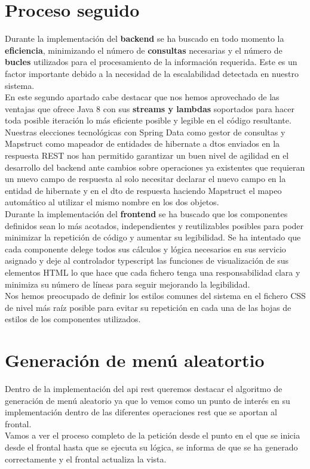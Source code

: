 \documentclass[12pt, a4paper, twoside]{book}
\begin{document}
	\section{Proceso seguido}
	Durante la implementación del \textbf{backend} se ha buscado en todo momento la \textbf{eficiencia}, minimizando el número de \textbf{consultas} necesarias y el número de \textbf{bucles} utilizados para el procesamiento de la información requerida. Este es un factor importante debido a la necesidad de la escalabilidad detectada en nuestro sistema.\\
	En este segundo apartado cabe destacar que nos hemos aprovechado de las ventajas que ofrece Java 8 con sus \textbf{streams y lambdas} soportados para hacer toda posible iteración lo más eficiente posible y legible en el código resultante.\\
	Nuestras elecciones tecnológicas con Spring Data como gestor de consultas y Mapstruct como mapeador de entidades de hibernate a dtos enviados en la respuesta REST nos han permitido garantizar un buen nivel de agilidad en el desarrollo del backend ante cambios sobre operaciones ya existentes que requieran un nuevo campo de respuesta al solo necesitar declarar el nuevo campo en la entidad de hibernate y en el dto de respuesta haciendo Mapstruct el mapeo automático al utilizar el mismo nombre en los dos objetos.\\
	Durante la implementación del \textbf{frontend} se ha buscado que los componentes definidos sean lo más acotados, independientes y reutilizables posibles para poder minimizar la repetición de código y aumentar su legibilidad. Se ha intentado que cada componente delege todos sus cálculos y lógica necesarios en sus servicio asignado y deje al controlador typescript las funciones de visualización de sus elementos HTML lo que hace que cada fichero tenga una responsabilidad clara y minimiza su número de líneas para seguir mejorando la legibilidad.\\
	Nos hemos preocupado de definir los estilos comunes del sistema en el fichero CSS de nivel más raíz posible para evitar su repetición en cada una de las hojas de estilos de los componentes utilizados.
	\section{Generación de menú aleatortio}
	Dentro de la implementación del api rest queremos destacar el algoritmo de generación de menú aleatorio ya que lo vemos como un punto de interés en su implementación dentro de las diferentes operaciones rest que se aportan al frontal. \\Vamos a ver el proceso completo de la petición desde el punto en el que se inicia desde el frontal hasta que se ejecuta su lógica, se informa de que se ha generado correctamente y el frontal actualiza la vista.\\
\end{document}
